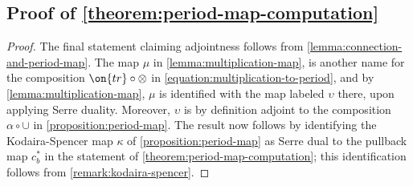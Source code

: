\subsection{Proof of \autoref{theorem:period-map-computation}}
\begin{proof}
\label{subsection:proof-period-map}
	The final statement claiming adjointness follows from
	\autoref{lemma:connection-and-period-map}.
	The map $\mu$ in \autoref{lemma:multiplication-map},
	is another name for the composition
	$\on{tr} \circ \otimes$ in \eqref{equation:multiplication-to-period},
	and by \autoref{lemma:multiplication-map},
	$\mu$ is identified with the map labeled $\upsilon$ there, upon applying
	Serre duality.
	Moreover, $\upsilon$ is by definition adjoint to the composition $\alpha \circ \cup$
	in \autoref{proposition:period-map}.
	The result now follows by identifying the Kodaira-Spencer map $\kappa$
	of \autoref{proposition:period-map} as Serre dual to the pullback map
	$c_b^*$ in the statement of \autoref{theorem:period-map-computation};
	this identification follows from \autoref{remark:kodaira-spencer}.
\end{proof}
